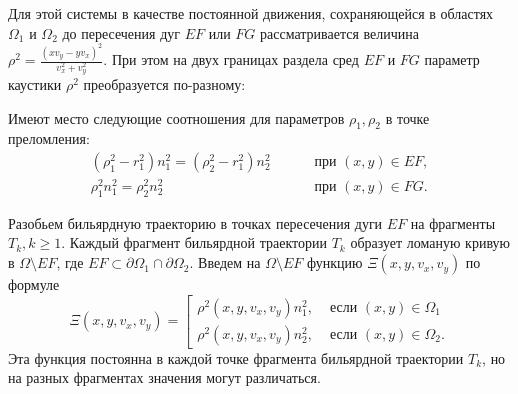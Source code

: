 Для этой системы в качестве постоянной движения, сохраняющейся в областях $\Omega_1$ и $\Omega_2$ до пересечения дуг $EF$ или $FG$ рассматривается величина $\rho^2 =  \frac{(x v_y - y v_x)^2}{v_x^2 + v_y^2}$. При этом на двух границах раздела сред $EF$ и $FG$ параметр каустики $\rho^2$ преобразуется по-разному:
\begin{statement}
Имеют место следующие соотношения для параметров $\rho_1, \rho_2$ в точке преломления:
\begin{align}
(\rho_1^2 - r_1^2)n_1^2 = (\rho_2^2 - r_1^2)n_2^2 \qquad & 
			\text{ при } (x,y) \in EF, 
			\label{eq:st1_eq1}
			\\
\rho_1^2 n_1^2 = \rho_2^2 n_2^2 \qquad  & \text{ при } (x,y) \in FG.
			\label{eq:st1_eq2}
\end{align}
\label{st:across_EF}
\end{statement}

Разобьем бильярдную траекторию в точках пересечения дуги $EF$ на фрагменты $T_k, k \geq 1$. 
Каждый фрагмент бильярдной траектории $T_k$ образует ломаную кривую в $\Omega \setminus EF$, где $EF  \subset \partial \Omega_1 \cap \partial \Omega_2$.
Введем на $\Omega \setminus EF$ функцию $\Xi(x, y, v_x, v_y)$ по формуле
\begin{equation}
\Xi(x, y, v_x, v_y) = \left[
\begin{array}{ll}
    \rho^2(x,y,v_x,v_y) n_1^2, &  \text{ если } (x,y) \in \Omega_1 \\
    \rho^2(x,y,v_x,v_y) n_2^2, & \text{ если } (x,y) \in \Omega_2.
\end{array}
\right.
\label{eq:XiDefinition}
\end{equation}
Эта функция постоянна в каждой точке фрагмента бильярдной траектории $T_k$, но на разных фрагментах значения могут различаться. 


